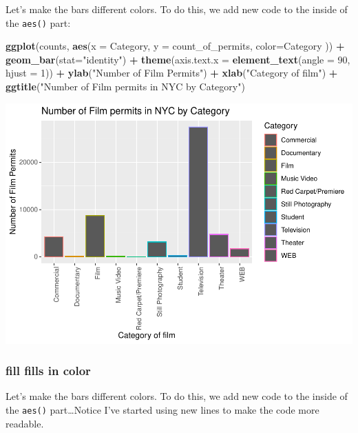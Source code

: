 \documentclass[]{book}
\newenvironment{Shaded}{\begin{snugshade}}{\end{snugshade}}
\newcommand{\KeywordTok}[1]{\textcolor[rgb]{0.13,0.29,0.53}{\textbf{#1}}}
\newcommand{\DataTypeTok}[1]{\textcolor[rgb]{0.13,0.29,0.53}{#1}}
\newcommand{\DecValTok}[1]{\textcolor[rgb]{0.00,0.00,0.81}{#1}}
\newcommand{\StringTok}[1]{\textcolor[rgb]{0.31,0.60,0.02}{#1}}
\newcommand{\OperatorTok}[1]{\textcolor[rgb]{0.81,0.36,0.00}{\textbf{#1}}}
\newcommand{\NormalTok}[1]{#1}
\begin{document}
Let's make the bars different colors. To do this, we add new code to the
inside of the \texttt{aes()} part:

\begin{Shaded}
\begin{Highlighting}[]
\KeywordTok{ggplot}\NormalTok{(counts, }\KeywordTok{aes}\NormalTok{(}\DataTypeTok{x =}\NormalTok{ Category, }\DataTypeTok{y =}\NormalTok{ count_of_permits, }\DataTypeTok{color=}\NormalTok{Category )) }\OperatorTok{+}
\StringTok{  }\KeywordTok{geom_bar}\NormalTok{(}\DataTypeTok{stat=}\StringTok{"identity"}\NormalTok{) }\OperatorTok{+}\StringTok{ }
\StringTok{  }\KeywordTok{theme}\NormalTok{(}\DataTypeTok{axis.text.x =} \KeywordTok{element_text}\NormalTok{(}\DataTypeTok{angle =} \DecValTok{90}\NormalTok{, }\DataTypeTok{hjust =} \DecValTok{1}\NormalTok{)) }\OperatorTok{+}
\StringTok{  }\KeywordTok{ylab}\NormalTok{(}\StringTok{"Number of Film Permits"}\NormalTok{) }\OperatorTok{+}\StringTok{ }
\StringTok{  }\KeywordTok{xlab}\NormalTok{(}\StringTok{"Category of film"}\NormalTok{) }\OperatorTok{+}
\StringTok{  }\KeywordTok{ggtitle}\NormalTok{(}\StringTok{"Number of Film permits in NYC by Category"}\NormalTok{)}
\end{Highlighting}
\end{Shaded}

\includegraphics{Statistics_Lab_files/figure-latex/1categoryF-1.pdf}

\subsubsection{fill fills in color}\label{fill-fills-in-color}

Let's make the bars different colors. To do this, we add new code to the
inside of the \texttt{aes()} part\ldots{}Notice I've started using new
lines to make the code more readable.
\end{document}

